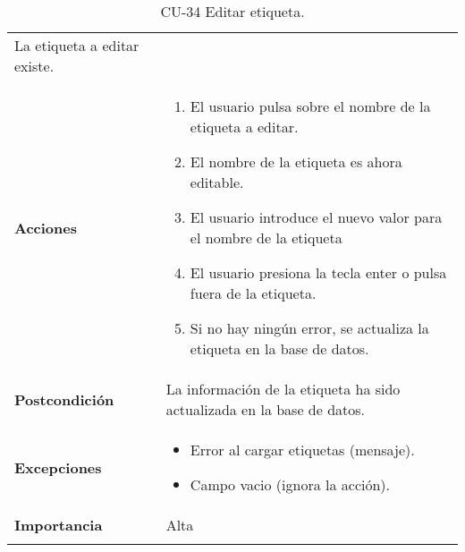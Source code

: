 \begin{longtable}[]{@{}ll@{}}
\begin{minipage}[t]{0.70\columnwidth}
La etiqueta a editar existe.\strut
\end{minipage}\tabularnewline
\begin{minipage}[t]{0.24\columnwidth}\raggedright
\textbf{Acciones}\strut
\end{minipage} & \begin{minipage}[t]{0.70\columnwidth}\raggedright
\begin{enumerate}
\def\labelenumi{\arabic{enumi}.}
\tightlist
\item
  El usuario pulsa sobre el nombre de la etiqueta a editar.
\item
  El nombre de la etiqueta es ahora editable.
\item
  El usuario introduce el nuevo valor para el nombre de la etiqueta
\item
  El usuario presiona la tecla enter o pulsa fuera de la etiqueta.
\item
  Si no hay ningún error, se actualiza la etiqueta en la base de datos.
\end{enumerate}\strut
\end{minipage}\tabularnewline
\begin{minipage}[t]{0.24\columnwidth}\raggedright
\textbf{Postcondición}\strut
\end{minipage} & \begin{minipage}[t]{0.70\columnwidth}\raggedright
La información de la etiqueta ha sido actualizada en la base de
datos.\strut
\end{minipage}\tabularnewline
\begin{minipage}[t]{0.24\columnwidth}\raggedright
\textbf{Excepciones}\strut
\end{minipage} & \begin{minipage}[t]{0.70\columnwidth}\raggedright
\begin{itemize}
\tightlist
\item
  Error al cargar etiquetas (mensaje).
\item
  Campo vacio (ignora la acción).
\end{itemize}\strut
\end{minipage}\tabularnewline
\begin{minipage}[t]{0.24\columnwidth}\raggedright
\textbf{Importancia}\strut
\end{minipage} & \begin{minipage}[t]{0.70\columnwidth}\raggedright
Alta\strut
\end{minipage}\tabularnewline
\bottomrule
\caption{CU-34 Editar etiqueta.}
\end{longtable}

